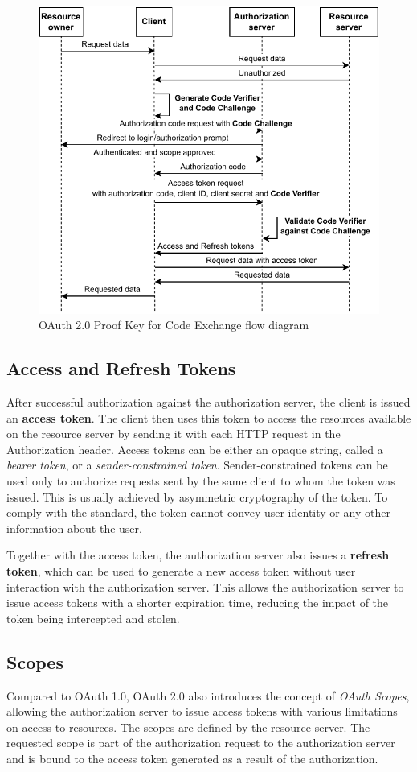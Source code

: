 \begin{figure}[hbt]
  \centering
  \includegraphics[width=.8 \linewidth]{figures/auth-sequence-pkce.pdf}
  \caption{OAuth 2.0 Proof Key for Code Exchange flow diagram}
  \label{fig:oauth2_pkce}
\end{figure}

\subsection*{Access and Refresh Tokens}
After successful authorization against the authorization server, the client is issued an \textbf{access token}. The client then uses this token to access the resources available on the resource server by sending it with each HTTP request in the Authorization header. Access tokens can be either an opaque string, called a \emph{bearer token}, or a \emph{sender-constrained token}. Sender-constrained tokens can be used only to authorize requests sent by the same client to whom the token was issued. This is usually achieved by asymmetric cryptography of the token. To comply with the standard, the token cannot convey user identity or any other information about the user.

Together with the access token, the authorization server also issues a \textbf{refresh token}, which can be used to generate a new access token without user interaction with the authorization server. This allows the authorization server to issue access tokens with a shorter expiration time, reducing the impact of the token being intercepted and stolen.

\subsection*{Scopes}
Compared to OAuth 1.0, OAuth 2.0 also introduces the concept of \emph{OAuth Scopes}, allowing the authorization server to issue access tokens with various limitations on access to resources. The scopes are defined by the resource server. The requested scope is part of the authorization request to the authorization server and is bound to the access token generated as a result of the authorization.

